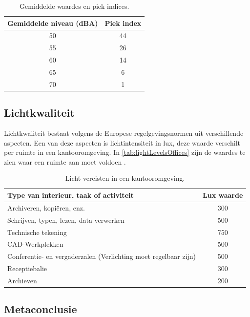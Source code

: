 \begin{table}[ht]
    \centering
    \begin{tabular}{ c | c }
        Gemiddelde niveau (dBA) & Piek index\\
        \hline
        50 & 44 \\
        55 & 26 \\
        60 & 14 \\
        65 & 6  \\
        70 & 1 
    \end{tabular}
    \caption{Gemiddelde waardes en piek indices.}
    \label{tab:soundLevels}
\end{table}


\subsection{Lichtkwaliteit}

Lichtkwaliteit bestaat volgens de Europese regelgevingsnormen uit verschillende aspecten\cite{lightingIndorWorkspaces}. Een van deze aspecten is lichtintensiteit in lux, deze waarde verschilt per ruimte in een kantooromgeving. In \autoref{tab:lightLevelsOffices} zijn de waardes te zien waar een ruimte aan moet voldoen \cite{lightingIndorWorkspaces}.

\begin{table}[ht]
    \centering
    \begin{tabular}{ l | c }
        Type van interieur, taak of activiteit & Lux waarde\\
        \hline
        Archiveren, kopiëren, enz. & 300 \\
        Schrijven, typen, lezen, data verwerken & 500 \\
        Technische tekening & 750 \\
        CAD-Werkplekken & 500  \\
        Conferentie- en vergaderzalen (Verlichting moet regelbaar zijn) & 500  \\
        Receptiebalie & 300 \\
        Archieven & 200 

    \end{tabular}
    \caption{Licht vereisten in een kantooromgeving\cite{lightingIndorWorkspaces}.}
    \label{tab:lightLevelsOffices}
\end{table}

\subsection{Metaconclusie}

